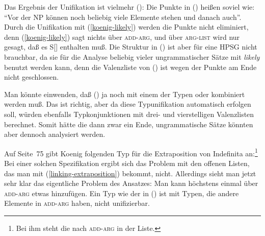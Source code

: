 \z
Das Ergebnis der Unifikation ist vielmehr ():
\ea
{}
\z
Die Punkte in () heißen soviel wie: "`Vor der NP können noch beliebig viele Elemente
stehen und danach auch"'. Durch die Unifikation mit (\ref{koenig-likely}) werden die Punkte
nicht eliminiert, denn (\ref{koenig-likely}) sagt nichts über \textsc{add-arg}, und über
\textsc{arg-list} wird nur gesagt, daß es S[] enthalten muß.
Die Struktur in () ist aber für eine HPSG nicht brauchbar, da sie für
die Analyse beliebig vieler ungrammatischer Sätze mit \emph{likely} benutzt werden kann,
denn die Valenzliste von () ist wegen der Punkte am Ende nicht geschlossen.

Man könnte einwenden, daß () ja noch mit einem der Typen  oder
 kombiniert werden muß. Das ist richtig, aber da diese Typunifikation
automatisch erfolgen soll, würden ebenfalls Typkonjunktionen mit drei- und vierstelligen
Valenzlisten berechnet. Somit hätte die \subcatl dann zwar ein Ende, ungrammatische
Sätze könnten aber dennoch analysiert werden.

Auf Seite~75 gibt Koenig folgenden Typ für die Extraposition von Indefinita an:\footnote{
  Bei ihm steht die  nach \textsc{add-arg} in der Liste.%
}
\ea
{}
\z
Bei einer solchen Spezifikation ergibt sich das Problem mit den offenen Listen,
das man mit (\ref{linking-extraposition}) bekommt, nicht. Allerdings sieht man jetzt
sehr klar das eigentliche Problem des Ansatzes: Man kann höchstens einmal über \textsc{add-arg}
etwas hinzufügen. Ein Typ wie der in () ist mit Typen, die andere Elemente
in \textsc{add-arg} haben, nicht unifizierbar.

